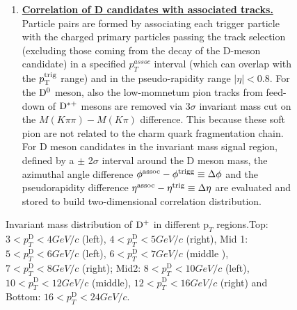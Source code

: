\begin{enumerate}
\begin{figure}
\begin{enumerate}
\begin{figure}[!htp]
\caption{Invariant mass distribution of ${\rm D^+}$ in different $\text{p}_T$ regions.Top: $3< p_{T}^{\text{D}}< 4 GeV/c$ (left), $4< p_{T}^{\text{D}}< 5 GeV/c$ (right), Mid 1: $5< p_{T}^{\text{D}}< 6 GeV/c$ (left), $6 < p_{T}^{\text{D}} < 7 GeV/c$ (middle ), $7< p_{T}^{\text{D}}< 8 GeV/c$ (right); Mid2: $8< p_{T}^{\text{D}}< 10GeV/c$ (left), $10< p_{T}^{\text{D}}< 12 GeV/c$ (middle), $12 < p_{T}^{\text{D}}< 16 GeV/c$ (right) and Bottom: $16<p_{T}^{\text{D}}< 24 GeV/c$.}
\label{fig:InvMass}
\end{figure}


The D mesons are selected in the rapidity range varying from $|y|<0.5$ at low $\pt$ to $|y|<0.8$ for $\pt>5~\gev/c$. %

\item
\underline {\bf Correlation of D candidates with associated tracks.}
Particle pairs are formed by associating each trigger particle with
the charged primary particles passing the track selection (excluding those coming from the decay of the D-meson candidate) in a specified $p^{assoc}_{T}$
interval (which can overlap with the $p_{\rm T}^{\rm trig}$ range) and in the pseudo-rapidity range $|\eta|<0.8$. For the ${\rm D^0}$ meson, also the low-momnetum pion tracks from feed-down of ${\rm D^{*+}}$ mesons are removed via 3$\sigma$ invariant mass cut on the $M(K\pi\pi)-M(K\pi)$ difference. This because these soft pion are not related to the charm quark fragmentation chain.
For D meson candidates in the invariant mass signal region, defined by a $\pm$ 2$\sigma$ interval around the D meson mass, the azimuthal angle difference $\phi^{\rm assoc}-\phi^{\rm trigg}\equiv\Delta\phi$
and the pseudorapidity difference $\eta^{\rm assoc}-\eta^{\rm trig}\equiv\Delta \eta$ are evaluated and stored to build two-dimensional correlation distribution. %


\end{enumerate}
\end{figure}
\end{enumerate}
